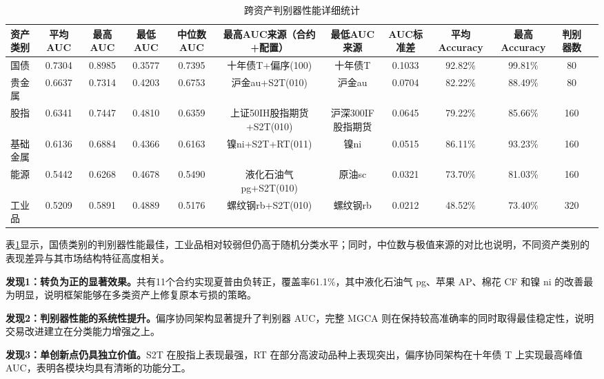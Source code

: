 \begin{table}
\centering
\footnotesize
\caption{跨资产判别器性能详细统计}
\label{tab:crossAssetDiscriminator}
\begin{tabular}{lccccccccccc}
\toprule
\textbf{资产类别} & \textbf{平均AUC} & \textbf{最高AUC} & \textbf{最低AUC} & \textbf{中位数AUC} & \textbf{最高AUC来源（合约+配置）} & \textbf{最低AUC来源} & \textbf{AUC标准差} & \textbf{平均Accuracy} & \textbf{最高Accuracy} & \textbf{判别器数} \\
\midrule
国债     & 0.7304 & 0.8985 & 0.3577 & 0.7395 & 十年债T+偏序(100)     & 十年债T   & 0.1033 & 92.82\% & 99.81\% & 80  \\
贵金属   & 0.6637 & 0.7314 & 0.4203 & 0.6753 & 沪金au+S2T(010)    & 沪金au  & 0.0704 & 82.22\% & 88.49\% & 80  \\
股指     & 0.6341 & 0.7447 & 0.4810 & 0.6359 & 上证50IH股指期货+S2T(010)    & 沪深300IF股指期货  & 0.0645 & 79.22\% & 85.66\% & 160 \\
基础金属 & 0.6136 & 0.6884 & 0.4366 & 0.6163 & 镍ni+S2T+RT(011) & 镍ni  & 0.0515 & 86.11\% & 93.23\% & 160 \\
能源     & 0.5442 & 0.6268 & 0.4678 & 0.5490 & 液化石油气pg+S2T(010)    & 原油sc  & 0.0321 & 73.70\% & 81.03\% & 160 \\
工业品   & 0.5209 & 0.5891 & 0.4889 & 0.5176 & 螺纹钢rb+S2T(010)    & 螺纹钢rb  & 0.0212 & 48.52\% & 73.40\% & 320 \\
\bottomrule
\end{tabular}
\vspace{0.2cm}
\end{table}

表\ref{tab:crossAssetDiscriminator}显示，国债类别的判别器性能最佳，工业品相对较弱但仍高于随机分类水平；同时，中位数与极值来源的对比也说明，不同资产类别的表现差异与其市场结构特征高度相关。

\textbf{发现1：转负为正的显著效果。}共有11个合约实现夏普由负转正，覆盖率61.1\%，其中液化石油气 pg、苹果 AP、棉花 CF 和镍 ni 的改善最为明显，说明框架能够在多类资产上修复原本亏损的策略。

\textbf{发现2：判别器性能的系统性提升。}偏序协同架构显著提升了判别器 AUC，完整 MGCA 则在保持较高准确率的同时取得最佳稳定性，说明交易改进建立在分类能力增强之上。

\textbf{发现3：单创新点仍具独立价值。}S2T 在股指上表现最强，RT 在部分高波动品种上表现突出，偏序协同架构在十年债 T 上实现最高峰值 AUC，表明各模块均具有清晰的功能分工。

